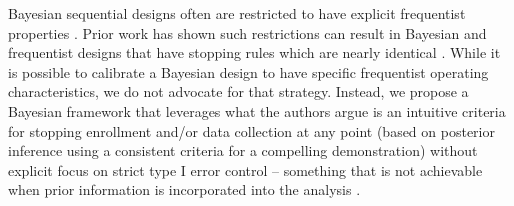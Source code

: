 \documentclass[12pt]{article}
\begin{document}
Bayesian sequential designs often are restricted to have explicit frequentist properties \citep{Ventz2015, Zhu2015}. 
Prior work has shown such restrictions can result in Bayesian and frequentist designs that have stopping rules which are 
nearly identical \citep{Stallard2020, Kopp-Schneider2020, Zhu2019}.
While it is possible to calibrate a Bayesian design to have specific frequentist operating characteristics, we do not advocate
for that strategy.
Instead, we propose a Bayesian framework that leverages what the authors argue is an intuitive criteria for stopping enrollment 
and/or data collection at any point (based on posterior inference using a consistent criteria for a compelling demonstration) without 
explicit focus on strict type I error control -- something that is not achievable when prior information is incorporated into 
the analysis \citep{Psioda2018}.
\end{document}
